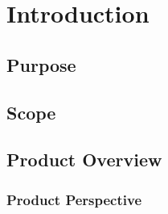 \chapter{Introduction}

\section{Purpose}

\section{Scope}

\section{Product Overview}

\subsection{Product Perspective}


